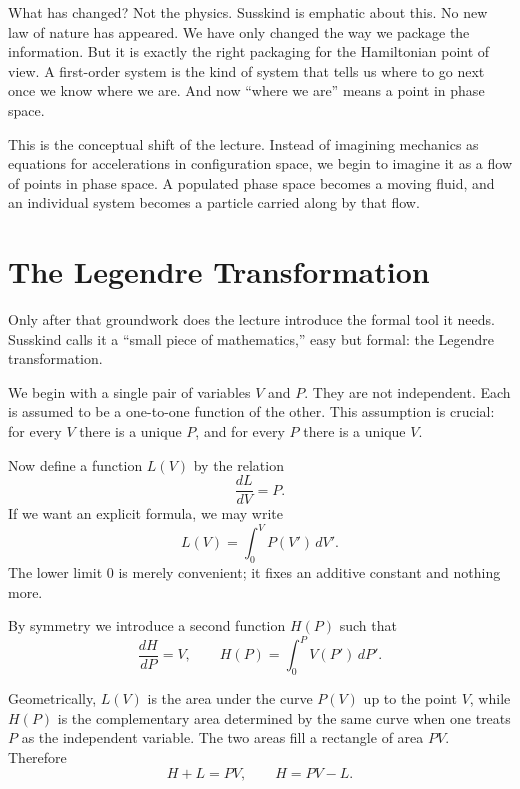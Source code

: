 What has changed? Not the physics. Susskind is emphatic about this. No new law of nature has appeared. We have only changed the way we package the information. But it is exactly the right packaging for the Hamiltonian point of view. A first-order system is the kind of system that tells us where to go next once we know where we are. And now ``where we are'' means a point in phase space.

This is the conceptual shift of the lecture. Instead of imagining mechanics as equations for accelerations in configuration space, we begin to imagine it as a flow of points in phase space. A populated phase space becomes a moving fluid, and an individual system becomes a particle carried along by that flow.

\section{The Legendre Transformation}

Only after that groundwork does the lecture introduce the formal tool it needs. Susskind calls it a ``small piece of mathematics,'' easy but formal: the Legendre transformation.

We begin with a single pair of variables \(V\) and \(P\). They are not independent. Each is assumed to be a one-to-one function of the other. This assumption is crucial: for every \(V\) there is a unique \(P\), and for every \(P\) there is a unique \(V\).

Now define a function \(L(V)\) by the relation
\begin{equation}
\frac{dL}{dV} = P .
\end{equation}
If we want an explicit formula, we may write
\begin{equation}
L(V)=\int_0^V P(V')\,dV' .
\end{equation}
The lower limit \(0\) is merely convenient; it fixes an additive constant and nothing more.

By symmetry we introduce a second function \(H(P)\) such that
\begin{equation}
\frac{dH}{dP}=V,
\qquad
H(P)=\int_0^P V(P')\,dP' .
\end{equation}

Geometrically, \(L(V)\) is the area under the curve \(P(V)\) up to the point \(V\), while \(H(P)\) is the complementary area determined by the same curve when one treats \(P\) as the independent variable. The two areas fill a rectangle of area \(PV\). Therefore
\begin{equation}
H+L=PV,
\qquad
H=PV-L .
\end{equation}

